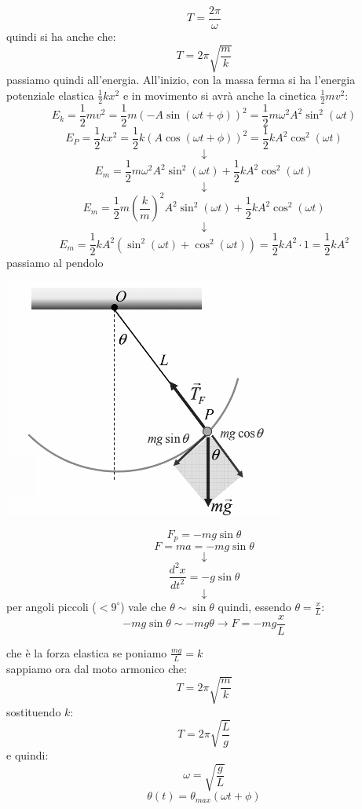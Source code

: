 \documentclass[a4paper,12pt, oneside]{book}
\begin{document}
$$T=\frac{2\pi}{\omega}$$
quindi si ha anche che:
$$T=2\pi\sqrt{\frac{m}{k}}$$
passiamo quindi all'energia. All'inizio, con la massa ferma si ha l'energia potenziale elastica $\frac{1}{2}kx^2$ e in movimento si avrà anche la cinetica $\frac{1}{2}mv^2$:
$$E_k=\frac{1}{2}mv^2=\frac{1}{2}m(-A\sin(\omega t+\phi))^2=\frac{1}{2}m\omega^2A^2\sin^2(\omega t)$$
$$E_P=\frac{1}{2}kx^2=\frac{1}{2}k(A\cos(\omega t+\phi))^2=\frac{1}{2}kA^2\cos^2(\omega t)$$
$$\downarrow$$
$$E_m=\frac{1}{2}m\omega^2A^2\sin^2(\omega t)+\frac{1}{2}kA^2\cos^2(\omega t)$$
$$\downarrow$$
$$E_m=\frac{1}{2}m\left(\frac{k}{m}\right)^2A^2\sin^2(\omega t)+\frac{1}{2}kA^2\cos^2(\omega t)$$
$$\downarrow$$
$$E_m=\frac{1}{2}kA^2(\sin^2(\omega t)+\cos^2(\omega t))=\frac{1}{2}kA^2\cdot 1=\frac{1}{2}kA^2$$
passiamo al pendolo
\begin{center}
	\includegraphics[scale=0.6]{img/pen.png}
\end{center}
$$F_p=-mg\sin\theta$$
$$F=ma=-mg\sin\theta $$
$$\downarrow$$
$$\frac{d^2x}{dt^2}=-g\sin\theta$$
$$\downarrow$$
per angoli piccoli ($<9^\circ$) vale che $\theta\sim \sin\theta$ quindi, essendo $\theta=\frac{x}{L}$:
$$-mg\sin\theta\sim -mg \theta\longrightarrow F=-mg\frac{x}{L}$$

che è la forza elastica se poniamo $\frac{mg}{L}=k$
\\ sappiamo ora dal moto armonico che:
$$T=2\pi\sqrt{\frac{m}{k}}$$
sostituendo $k$:
$$T=2\pi\sqrt{\frac{L}{g}}$$
e quindi:
$$\omega=\sqrt{\frac{g}{L}}$$
$$\theta(t)=\theta_{max}(\omega t+\phi)$$
\end{document}
